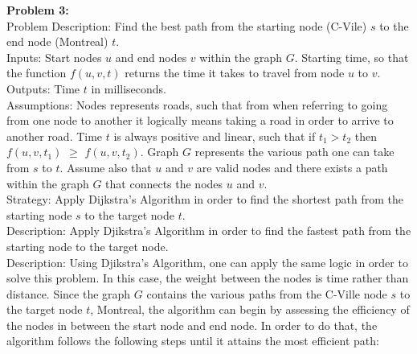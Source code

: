 \documentclass{article}
\begin{document}
\textbf{Problem 3:}\\
Problem Description: Find the best path from the starting node (C-Vile) \(s\) to the end node (Montreal) \(t\).\\
Inputs: Start nodes \(u\) and end nodes \(v\) within the graph \(G\). Starting time, so that the function \(f(u,v,t)\) returns the time it takes to travel from node \(u\) to \(v\). 
Outputs: Time \(t\) in milliseconds. \\
Assumptions: Nodes represents roads, such that from when referring to going from one node to another it logically means taking a road in order to arrive to another road. Time \(t\) is always positive and linear, such that if \(t_1\)$>$\(t_2\) then \(f(u,v,t_1)\) $\geq$ \(f(u,v,t_2)\). Graph \(G\) represents the various path one can take from \(s\) to \(t\). Assume also that \(u\) and \(v\) are valid nodes and there exists a path within the graph \(G\) that connects the nodes \(u\) and \(v\). \\
Strategy: Apply Dijkstra's Algorithm in order to find the shortest path from the starting node \(s\) to the target node \(t\).\\
Description: Apply Djikstra's Algorithm in order to find the fastest path from the starting node  to the target node. \\
Description: Using Djikstra's Algorithm, one can apply the same logic in order to solve this problem. In this case, the weight between the nodes is time rather than distance. Since the graph \(G\) contains the various paths from the C-Ville node \(s\) to the target node \(t\), Montreal, the algorithm can begin by assessing the efficiency of the nodes in between the start node and end node. In order to do that, the algorithm follows the following steps until it attains the most efficient path:\\
\end{document}
